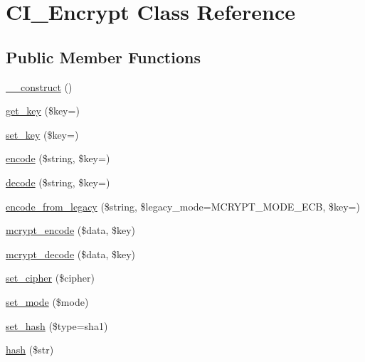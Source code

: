 \hypertarget{class_c_i___encrypt}{}\section{C\+I\+\_\+\+Encrypt Class Reference}
\label{class_c_i___encrypt}
\subsection*{Public Member Functions}
\begin{DoxyCompactItemize}
\item 
\mbox{\hyperlink{class_c_i___encrypt_a17a94bcccf4727fcdda961b98525e116}{\+\_\+\+\_\+construct}} ()
\item 
\mbox{\hyperlink{class_c_i___encrypt_ab07ff722228c6da19483e8608b240492}{get\+\_\+key}} (\$key=\textquotesingle{}\textquotesingle{})
\item 
\mbox{\hyperlink{class_c_i___encrypt_ae8aec29f6c4b90380a014a80a26adb18}{set\+\_\+key}} (\$key=\textquotesingle{}\textquotesingle{})
\item 
\mbox{\hyperlink{class_c_i___encrypt_ac98c8120dfabdb2c56bca7b1c839842e}{encode}} (\$string, \$key=\textquotesingle{}\textquotesingle{})
\item 
\mbox{\hyperlink{class_c_i___encrypt_ae8e7633c806215f70d9406249bfbd799}{decode}} (\$string, \$key=\textquotesingle{}\textquotesingle{})
\item 
\mbox{\hyperlink{class_c_i___encrypt_a11669af69e0b813144defd698754fc0b}{encode\+\_\+from\+\_\+legacy}} (\$string, \$legacy\+\_\+mode=M\+C\+R\+Y\+P\+T\+\_\+\+M\+O\+D\+E\+\_\+\+E\+CB, \$key=\textquotesingle{}\textquotesingle{})
\item 
\mbox{\hyperlink{class_c_i___encrypt_a97f07123b0ff7d39e35b73cf3204d47b}{mcrypt\+\_\+encode}} (\$data, \$key)
\item 
\mbox{\hyperlink{class_c_i___encrypt_a611752b3b91a1fb19edf7addc8109fc3}{mcrypt\+\_\+decode}} (\$data, \$key)
\item 
\mbox{\hyperlink{class_c_i___encrypt_aafe98e2eebfd602c3fd83c04958b40ca}{set\+\_\+cipher}} (\$cipher)
\item 
\mbox{\hyperlink{class_c_i___encrypt_a7f8ec4d2688450a895ab2803a24e4edc}{set\+\_\+mode}} (\$mode)
\item 
\mbox{\hyperlink{class_c_i___encrypt_aa313c5ec6129174310a0c60e8532ffc3}{set\+\_\+hash}} (\$type=\textquotesingle{}sha1\textquotesingle{})
\item 
\mbox{\hyperlink{class_c_i___encrypt_aad37b41424590ccb444d8a08690955cb}{hash}} (\$str)
\end{DoxyCompactItemize}

